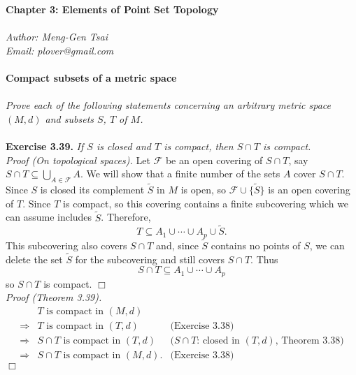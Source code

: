 \documentclass{article}
\begin{document}
\textbf{\Large Chapter 3: Elements of Point Set Topology} \\\\



\emph{Author: Meng-Gen Tsai} \\
\emph{Email: plover@gmail.com} \\\\






\textbf{\large Compact subsets of a metric space} \\\\

\emph{Prove each of the following statements concerning an arbitrary metric space
$(M,d)$ and subsets $S$, $T$ of $M$.} \\\\

\textbf{Exercise 3.39.}
\emph{If $S$ is closed and $T$ is compact, then $S \cap T$ is compact.} \\

\emph{Proof (On topological spaces).}
Let $\mathscr{F}$ be an open covering of $S \cap T$, say
$S \cap T \subseteq \bigcup_{A \in \mathscr{F}}A$.
We will show that a finite number of the sets $A$ cover $S \cap T$.
Since $S$ is closed its complement $\widetilde{S}$ in $M$ is open,
so $\mathscr{F} \cup \{ \widetilde{S} \}$ is an open covering of $T$.
Since $T$ is compact, so this covering contains a finite subcovering
which we can assume includes $\widetilde{S}$.
Therefore,
$$T \subseteq A_1 \cup \cdots \cup A_p \cup \widetilde{S}.$$
This subcovering also covers $S \cap T$ and, since $\widetilde{S}$ contains no points of $S$,
we can delete the set $\widetilde{S}$ for the subcovering and still covers $S \cap T$.
Thus
$$S \cap T \subseteq A_1 \cup \cdots \cup A_p$$
so $S \cap T$ is compact.
$\Box$ \\

\emph{Proof (Theorem 3.39).}
\begin{align*}
&\text{$T$ is compact in $(M,d)$} \\
\Longrightarrow&
\text{$T$ is compact in $(T,d)$}
  &\text{(Exercise 3.38)} \\
\Longrightarrow&
\text{$S \cap T$ is compact in $(T,d)$}
  &\text{($S \cap T$: closed in $(T,d)$, Theorem 3.38)} \\
\Longrightarrow&
\text{$S \cap T$ is compact in $(M,d)$}.
  &\text{(Exercise 3.38)}
\end{align*}
$\Box$ \\\\
\end{document}

